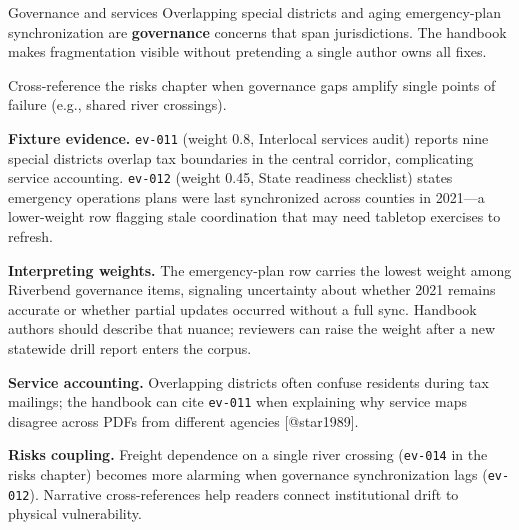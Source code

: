 \documentclass[
  ignorenonframetext,
]{beamer}
\author{\texorpdfstring{}{}}
\date{}
\begin{document}
\begin{frame}[fragile]{Governance and services}
\protect{}\label{governance-and-services}
Overlapping special districts and aging emergency-plan synchronization
are \textbf{governance} concerns that span jurisdictions. The handbook
makes fragmentation visible without pretending a single author owns all
fixes.

Cross-reference the risks chapter when governance gaps amplify single
points of failure (e.g., shared river crossings).

\textbf{Fixture evidence.} \texttt{ev-011} (weight 0.8, Interlocal
services audit) reports nine special districts overlap tax boundaries in
the central corridor, complicating service accounting. \texttt{ev-012}
(weight 0.45, State readiness checklist) states emergency operations
plans were last synchronized across counties in 2021---a lower-weight
row flagging stale coordination that may need tabletop exercises to
refresh.

\textbf{Interpreting weights.} The emergency-plan row carries the lowest
weight among Riverbend governance items, signaling uncertainty about
whether 2021 remains accurate or whether partial updates occurred
without a full sync. Handbook authors should describe that nuance;
reviewers can raise the weight after a new statewide drill report enters
the corpus.

\textbf{Service accounting.} Overlapping districts often confuse
residents during tax mailings; the handbook can cite \texttt{ev-011}
when explaining why service maps disagree across PDFs from different
agencies {[}@star1989{]}.

\textbf{Risks coupling.} Freight dependence on a single river crossing
(\texttt{ev-014} in the risks chapter) becomes more alarming when
governance synchronization lags (\texttt{ev-012}). Narrative
cross-references help readers connect institutional drift to physical
vulnerability.
\end{frame}
\end{document}
